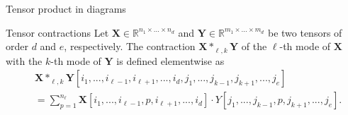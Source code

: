 \documentclass{beamer}
\newcommand{\bvec}[1]{\mathbf{#1}}
\newcommand{\vX}{\bvec{X}}
\newcommand{\vY}{\bvec{Y}}
\begin{document}
\begin{frame}{Tensor product in diagrams}
    
\end{frame}

\begin{frame}{Tensor contractions}
Let $\vX \in \mathbb{R}^{n_1\times ... \times n_d}$ and  $\vY \in \mathbb{R}^{m_1\times ... \times m_d}$ be two tensors of order $d$ and $e$, respectively. 
The contraction $\vX *_{\ell,k} \vY$ of the $\ell$-th mode of $\vX$ with the $k$-th mode of $\vY$ is defined elementwise as
\begin{equation*}
\begin{aligned}
&\vX *_{\ell,k} \vY [i_1, . . . ,i_{\ell-1},i_{\ell+1}, . . . ,i_d, j_1, . . . , j_{k-1}, j_{k+1}, . . . , j_e]\\
&=
\sum_{p=1}^{n_\ell}
\vX [i_1, . . . ,i_{\ell-1}, p,i_{\ell+1}, . . . ,i_d] \cdot Y[j_1, . . . , j_{k-1}, p, j_{k+1}, . . . , j_e].
\end{aligned}
\end{equation*}
    
\end{frame}
\end{document}
